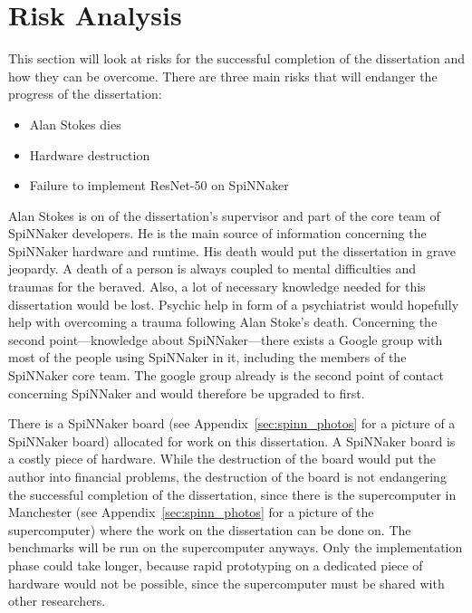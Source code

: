 \documentclass{article}
\begin{document}

\section{Risk Analysis} %
\label{sec:risk_analysis}

This section will look at risks for the successful
completion of the dissertation and how they can be
overcome.
There are three main risks that will endanger the progress
of the dissertation:
\begin{itemize}
  \item Alan Stokes dies
  \item Hardware destruction
  \item Failure to implement ResNet-50 on SpiNNaker
\end{itemize}

Alan Stokes is on of the dissertation's supervisor and part
of the core team of SpiNNaker developers.
He is the main source of information concerning the
SpiNNaker hardware and runtime.
His death would put the dissertation in grave jeopardy.
A death of a person is always coupled to mental
difficulties and traumas for the beraved.
Also, a lot of necessary knowledge needed for this
dissertation would be lost.
Psychic help in form of a psychiatrist would hopefully help
with overcoming a trauma following Alan Stoke's death.
Concerning the second point---knowledge about
SpiNNaker---there exists a Google group with most of the
people using SpiNNaker in it, including the members of the
SpiNNaker core team.
The google group already is the second point of contact
concerning SpiNNaker and would therefore be upgraded to
first.

There is a SpiNNaker board (see
Appendix~\ref{sec:spinn_photos} for a picture of a
SpiNNaker board) allocated for work on this dissertation.
A SpiNNaker board is a costly piece of hardware.
While the destruction of the board would put the author
into financial problems, the destruction of the board is
not endangering the successful completion of the
dissertation, since there is the supercomputer in
Manchester (see Appendix~\ref{sec:spinn_photos} for a
picture of the supercomputer) where the work on the
dissertation can be done on.
The benchmarks will be run on the supercomputer anyways.
Only the implementation phase could take longer, because
rapid prototyping on a dedicated piece of hardware would
not be possible, since the supercomputer must be shared
with other researchers.

\end{document}
